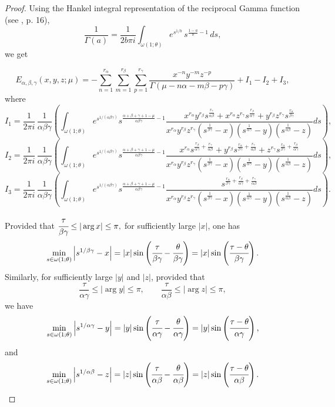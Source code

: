 \documentclass[12pt, reqno]{amsart}
\theoremstyle{definition}
\theoremstyle{remark}
\numberwithin{equation}{section}
\begin{document}
\begin{proof}
Using the Hankel integral representation of the reciprocal Gamma function (see \cite{Podlubny}, p. 16),  
\begin{equation}\label{gamma integral representation}
\frac{1}{\Gamma(a)} =
\frac{1}{2 b \pi i}
\int_{\omega(1;\theta)}
e^{s^{1/b}}\,
s^{\frac{1-a}{b}-1}\, ds,
\end{equation}
we get

$$E_{\alpha,\beta,\gamma}(x,y,z;\mu)
=-\sum_{n=1}^{r_{\alpha}}
\sum_{m=1}^{r_{\beta}}
\sum_{p=1}^{r_{\gamma}}
\frac{x^{-n}y^{-m}z^{-p}}{\Gamma(\mu-n\alpha-m\beta-p\gamma)}+I_1-I_2+I_3,
$$
where
$$I_1=\frac{1}{2\pi i}\,
\frac{1}{\alpha\beta\gamma}
\left(\int_{\omega(1;\theta)}
e^{s^{1/(\alpha\beta\gamma)}}s^{\frac{\alpha+\beta+\gamma+1-\mu}{\alpha\beta\gamma}-1}\frac{
x^{r_{\alpha}}y^{r_{\beta}}
s^{\frac{r_{\gamma}}{\alpha\beta}}
+x^{r_{\alpha}}z^{r_{\gamma}}
s^{\frac{r_{\beta}}{\alpha\gamma}}
+y^{r_{\beta}}z^{r_{\gamma}}
s^{\frac{r_{\alpha}}{\beta\gamma}}
}
{
x^{r_{\alpha}}
y^{r_{\beta}}
z^{r_{\gamma}}
\left(s^{\frac{1}{\beta\gamma}}-x\right)
\left(s^{\frac{1}{\alpha\gamma}}-y\right)
\left(s^{\frac{1}{\alpha\beta}}-z\right)
}ds\right),$$
$$
I_2=\frac{1}{2\pi i}\,
\frac{1}{\alpha\beta\gamma}
\left(\int_{\omega(1;\theta)}
e^{s^{1/(\alpha\beta\gamma)}}s^{\frac{\alpha+\beta+\gamma+1-\mu}{\alpha\beta\gamma}-1}\frac{
x^{r_{\alpha}}
s^{\frac{r_{\beta}}{\alpha\gamma}
+\frac{r_{\gamma}}{\alpha\beta}}
+y^{r_{\beta}}
s^{\frac{r_{\alpha}}{\beta\gamma}
+\frac{r_{\gamma}}{\alpha\beta}}
+z^{r_{\gamma}}
s^{\frac{r_{\alpha}}{\beta\gamma}
+\frac{r_{\beta}}{\alpha\gamma}}
}
{
x^{r_{\alpha}}
y^{r_{\beta}}
z^{r_{\gamma}}
\left(s^{\frac{1}{\beta\gamma}}-x\right)
\left(s^{\frac{1}{\alpha\gamma}}-y\right)
\left(s^{\frac{1}{\alpha\beta}}-z\right)
}ds\right),$$
$$
I_3=\frac{1}{2\pi i}\,
\frac{1}{\alpha\beta\gamma}
\left(\int_{\omega(1;\theta)}
e^{s^{1/(\alpha\beta\gamma)}}s^{\frac{\alpha+\beta+\gamma+1-\mu}{\alpha\beta\gamma}-1}\frac{
s^{\frac{r_{\alpha}}{\beta\gamma}
+\frac{r_{\beta}}{\alpha\gamma}
+\frac{r_{\gamma}}{\alpha\beta}}
}
{
x^{r_{\alpha}}
y^{r_{\beta}}
z^{r_{\gamma}}
\left(s^{\frac{1}{\beta\gamma}}-x\right)
\left(s^{\frac{1}{\alpha\gamma}}-y\right)
\left(s^{\frac{1}{\alpha\beta}}-z\right)
}ds\right).$$




Provided that
$
\cfrac{\tau}{\beta\gamma}\leq|\arg x|\le\pi,
$
for sufficiently large $|x|$, one has
\[
\min_{s\in\omega(1;\theta)}
\left|s^{1/\beta\gamma}-x\right|
= |x|
\sin\left(\cfrac{\tau}{\beta\gamma}-\cfrac{\theta}{\beta\gamma}\right)=|x|\sin\left(\cfrac{\tau-\theta}{\beta\gamma}\right).
\]
Similarly, for sufficiently large $|y|$ and $|z|$, provided that
\[
\frac{\tau}{\alpha\gamma}\leq|\arg y|\le\pi,
\qquad
\frac{\tau}{\alpha\beta}\leq|\arg z|\le\pi,
\]
we have
\[
\min_{s\in\omega(1;\theta)}
\left|s^{1/\alpha\gamma}-y\right|
= |y|
\sin\left(\cfrac{\tau}{\alpha\gamma}-\cfrac{\theta}{\alpha\gamma}\right)=|y|\sin\left(\cfrac{\tau-\theta}{\alpha\gamma}\right),
\]
and
\[
\min_{s\in\omega(1;\theta)}
\left|s^{1/\alpha\beta}-z\right|
= |z|
\sin\left(\cfrac{\tau}{\alpha\beta}-\cfrac{\theta}{\alpha\beta}\right)=|z|\sin\left(\cfrac{\tau-\theta}{\alpha\beta}\right).
\]


\end{proof}
\end{document}
